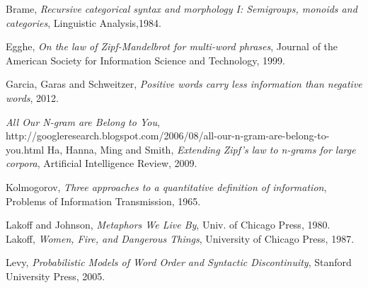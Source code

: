 \begin{thebibliography}{1}

 Brame, \emph{Recursive categorical syntax and morphology I: Semigroups, monoids and categories}, Linguistic Analysis,1984.

 Egghe, \emph{On the law of Zipf-Mandelbrot for multi-word phrases}, Journal of the American Society for Information Science and Technology, 1999.


 Garcia, Garas and Schweitzer, \emph{Positive words carry less information than negative words}, 2012.

 \emph{All Our N-gram are Belong to You},\\ http://googleresearch.blogspot.com/2006/08/all-our-n-gram-are-belong-to-you.html
Ha, Hanna, Ming and Smith, \emph{Extending Zipf's law to n-grams for large corpora}, Artificial Intelligence Review, 2009.

 Kolmogorov, \emph{Three approaches to a quantitative definition of information}, Problems of Information Transmission, 1965.

Lakoff and Johnson, \emph{Metaphors We Live By}, Univ. of Chicago Press, 1980.
Lakoff, \emph{Women, Fire, and Dangerous Things}, University of Chicago Press, 1987.

 Levy, \emph{Probabilistic Models of Word Order and Syntactic Discontinuity}, Stanford
University Press, 2005.




\end{thebibliography}
